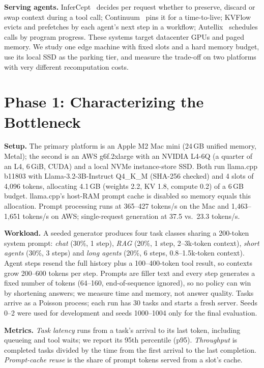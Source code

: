 \documentclass[conference,letterpaper]{IEEEtran}
\begin{document}
\textbf{Serving agents.} InferCept~\cite{abhyankar2024infercept} decides per request whether to preserve, discard or swap context during a tool call; Continuum~\cite{li2025continuum} pins it for a time-to-live; KVFlow~\cite{pan2025kvflow} evicts and prefetches by each agent's next step in a workflow; Autellix~\cite{luo2025autellix} schedules calls by program progress. These systems target datacenter GPUs and paged memory. We study one edge machine with fixed slots and a hard memory budget, use its local SSD as the parking tier, and measure the trade-off on two platforms with very different recomputation costs.

\section{Phase 1: Characterizing the Bottleneck}
\textbf{Setup.} The primary platform is an Apple M2 Mac mini (24\,GB unified memory, Metal); the second is an AWS g6f.2xlarge with an NVIDIA L4-6Q (a quarter of an L4, 6\,GiB, CUDA) and a local NVMe instance-store SSD. Both run llama.cpp b11803 with Llama-3.2-3B-Instruct Q4\_K\_M (SHA-256 checked) and 4 slots of 4,096 tokens, allocating 4.1\,GB (weights 2.2, KV 1.8, compute 0.2) of a 6\,GB budget. llama.cpp's host-RAM prompt cache is disabled so memory equals this allocation. Prompt processing runs at 365--427 tokens/s on the Mac and 1,463--1,651 tokens/s on AWS; single-request generation at 37.5 vs.\ 23.3 tokens/s.

\textbf{Workload.} A seeded generator produces four task classes sharing a 200-token system prompt: \emph{chat} (30\%, 1 step), \emph{RAG} (20\%, 1 step, 2--3k-token context), \emph{short agents} (30\%, 3 steps) and \emph{long agents} (20\%, 6 steps, 0.8--1.5k-token context). Agent steps resend the full history plus a 100--400-token tool result, so contexts grow 200--600 tokens per step. Prompts are filler text and every step generates a fixed number of tokens (64--160, end-of-sequence ignored), so no policy can win by shortening answers; we measure time and memory, not answer quality. Tasks arrive as a Poisson process; each run has 30 tasks and starts a fresh server. Seeds 0--2 were used for development and seeds 1000--1004 only for the final evaluation.

\textbf{Metrics.} \emph{Task latency} runs from a task's arrival to its last token, including queueing and tool waits; we report its 95th percentile (p95). \emph{Throughput} is completed tasks divided by the time from the first arrival to the last completion. \emph{Prompt-cache reuse} is the share of prompt tokens served from a slot's cache.
\end{document}
